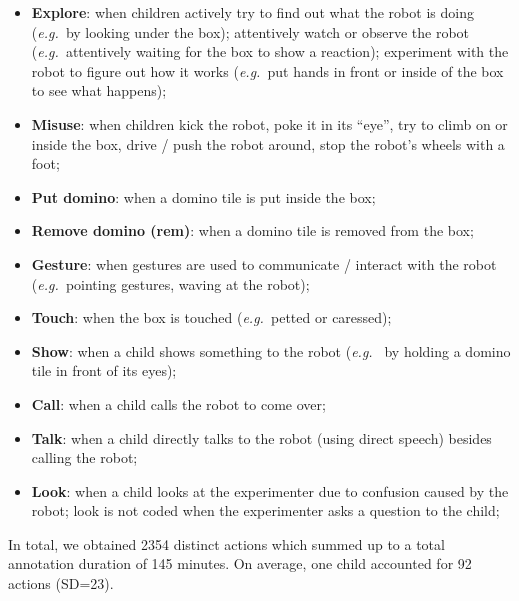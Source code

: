 \documentclass{sig-alternate}
\newcommand{\eg}{{\textit{e.g.~}}}
\begin{document}
\begin{itemize}

    \item \textbf{Explore}: when children actively try to find out what the
        robot is doing (\eg by looking under the box); attentively watch or
        observe the robot (\eg attentively waiting for the box to show a
        reaction); experiment with the robot to figure out how it works (\eg put
        hands in front or inside of the box to see what happens);

    \item \textbf{Misuse}: when children kick the robot, poke it in its
        ``eye'', try to climb on or inside the box, drive / push the robot
        around, stop the robot's wheels with a foot;

    \item \textbf{Put domino}: when a domino tile is put inside the box;

    \item \textbf{Remove domino (rem)}: when a domino tile is removed from the
        box;

    \item \textbf{Gesture}: when gestures are used to communicate /
        interact with the robot (\eg pointing gestures, waving at the robot);

    \item \textbf{Touch}: when the box is touched (\eg petted or
        caressed);

    \item \textbf{Show}: when a child shows something to the robot (\eg
        by holding a domino tile in front of its eyes);

    \item \textbf{Call}: when a child calls the robot to come over;

    \item \textbf{Talk}: when a child directly talks to the robot (using
        direct speech) besides calling the robot;

    \item \textbf{Look}: when a child looks at the experimenter due to
        confusion caused by the robot; look is not coded when the experimenter
        asks a question to the child;

\end{itemize}

In total, we obtained 2354 distinct actions which summed up to a total
annotation duration of 145 minutes. On average, one child accounted for 92
actions (SD=23).
\end{document}
